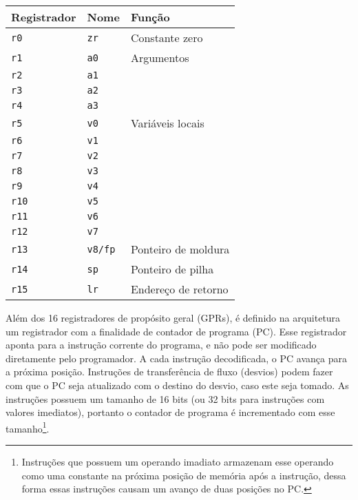 \documentclass[11pt,a4paper]{report}
\begin{document}
\begin{table}[htb!]
\centering
\begin{tabular}{|p{2.5cm}|p{2.5cm}|p{6.0cm}|}
\hline
\bf{Registrador} & \bf{Nome} & \bf{Função} 		\\ \hline \hline
\texttt{r0}	& \texttt{zr}		& Constante zero	\\ \hline
\texttt{r1}	& \texttt{a0}		& Argumentos	 	\\ \hline
\texttt{r2}	& \texttt{a1}		& 	 		\\ \hline
\texttt{r3}	& \texttt{a2}		& 	 		\\ \hline
\texttt{r4}	& \texttt{a3}		& 	 		\\ \hline
\texttt{r5}	& \texttt{v0}		& Variáveis locais	\\ \hline
\texttt{r6}	& \texttt{v1}		& 		 	\\ \hline
\texttt{r7}	& \texttt{v2}		& 		 	\\ \hline
\texttt{r8}	& \texttt{v3}		& 			\\ \hline
\texttt{r9}	& \texttt{v4}		& 		 	\\ \hline
\texttt{r10}	& \texttt{v5}		& 	 		\\ \hline
\texttt{r11}	& \texttt{v6}		& 	 		\\ \hline
\texttt{r12}	& \texttt{v7}		& 	 		\\ \hline
\texttt{r13}	& \texttt{v8/fp}	& Ponteiro de moldura	\\ \hline
\texttt{r14}	& \texttt{sp}		& Ponteiro de pilha 	\\ \hline
\texttt{r15}	& \texttt{lr}		& Endereço de retorno 	\\ \hline
\end{tabular}
\end{table}

Além dos 16 registradores de propósito geral (GPRs), é definido na
arquitetura um registrador com a finalidade de contador de programa (PC).
Esse registrador aponta para a instrução corrente do programa, e não pode
ser modificado diretamente pelo programador. A cada instrução decodificada,
o PC avança para a próxima posição. Instruções de transferência
de fluxo (desvios) podem fazer com que o PC seja atualizado com o
destino do desvio, caso este seja tomado. As instruções possuem um
tamanho de 16 bits (ou 32 bits para instruções com valores imediatos),
portanto o contador de programa é incrementado com esse tamanho\footnote{
Instruções que possuem um operando imadiato armazenam esse
operando como uma constante na próxima posição de memória após a
instrução, dessa forma essas instruções causam um avanço de duas
posições no PC.}.
\end{document}
